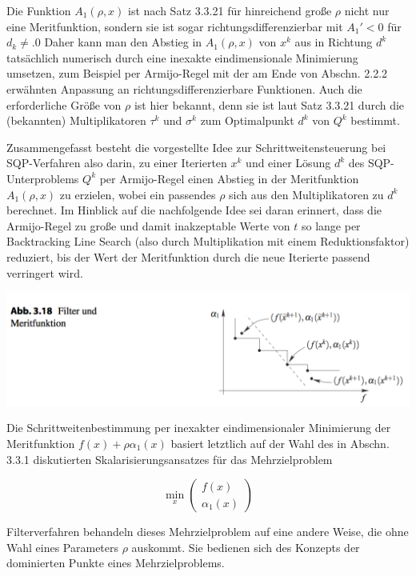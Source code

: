 \documentclass[11pt]{scrreprt}
\theoremstyle{thmstyle}
\numberwithin{thm}{section}
\begin{document}
Die Funktion $A_1 (\rho, x)$ ist nach Satz 3.3.21 für hinreichend große $\rho$ nicht nur eine Meritfunktion, sondern sie ist sogar richtungsdifferenzierbar mit $A_1' < 0$ für $d_k \neq. 0$ Daher kann man den Abstieg in $A_1(\rho, x)$ von $x^k$ aus in Richtung $d^k$ tatsächlich numerisch durch eine inexakte eindimensionale Minimierung umsetzen, zum Beispiel per Armijo-Regel mit der am Ende von Abschn. 2.2.2 erwähnten Anpassung an richtungsdifferenzierbare Funktionen. Auch die erforderliche Größe von $\rho$ ist hier bekannt, denn sie ist laut Satz 3.3.21 durch die (bekannten) Multiplikatoren $\tau^k$ und $\sigma^k$ zum Optimalpunkt $d^k$ von $Q^k$ bestimmt. ~\bigskip

Zusammengefasst besteht die vorgestellte Idee zur Schrittweitensteuerung bei SQP-Verfahren also darin, zu einer Iterierten $x^k$ und einer Lösung $d^k$ des SQP-Unterproblems $Q^k$ per Armijo-Regel einen Abstieg in der Meritfunktion $A_1(\rho, x)$ zu erzielen, wobei ein passendes $\rho$ sich aus den Multiplikatoren zu $d^k$ berechnet. Im Hinblick auf die nachfolgende Idee sei daran erinnert, dass die Armijo-Regel zu große und damit inakzeptable Werte von $t$ so lange per Backtracking Line Search (also durch Multiplikation mit einem Reduktionsfaktor) reduziert, bis der Wert der Meritfunktion durch die neue Iterierte passend verringert wird.

\begin{center}
	\includegraphics[scale=0.5]{img/ab318}
\end{center}

Die Schrittweitenbestimmung per inexakter eindimensionaler Minimierung der Meritfunktion $f (x) + \rho \alpha_1 (x)$ basiert letztlich auf der Wahl des in Abschn. 3.3.1 diskutierten Skalarisierungsansatzes für das Mehrzielproblem

	$$ \min_x \begin{pmatrix} f(x) \\ \alpha_1(x) \end{pmatrix} $$

Filterverfahren behandeln dieses Mehrzielproblem auf eine andere Weise, die ohne Wahl eines Parameters $\rho$ auskommt. Sie bedienen sich des Konzepts der dominierten Punkte eines Mehrzielproblems. ~\bigskip
\end{document}
